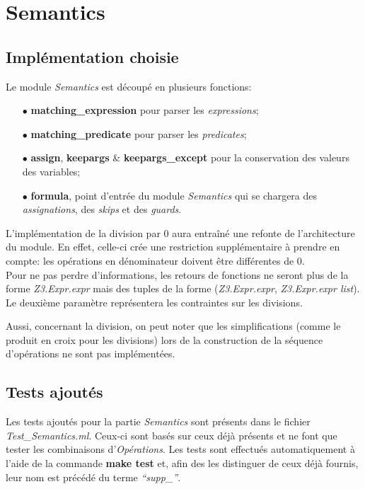 \section{Semantics}

\subsection{Implémentation choisie}

Le module \textit{Semantics} est découpé en plusieurs fonctions:
\begin{itemize}
\item[$\bullet$] {\textbf{matching\_expression} pour parser les \textit{expressions};}
\item[$\bullet$] {\textbf{matching\_predicate} pour parser les \textit{predicates};}
\item[$\bullet$] {\textbf{assign}, \textbf{keepargs} \& \textbf{keepargs\_except} pour la conservation des valeurs des variables;}
\item[$\bullet$] {\textbf{formula}, point d'entrée du module \textit{Semantics} qui se chargera des \textit{assignations}, des \textit{skips} et des \textit{guards}.}\\
\end{itemize}

L'implémentation de la division par 0 aura entraîné une refonte de l'architecture du module. En effet, celle-ci crée une restriction supplémentaire à prendre en compte: les opérations en dénominateur doivent être différentes de 0.\\
Pour ne pas perdre d'informations, les retours de fonctions ne seront plus de la forme \textit{Z3.Expr.expr} mais des tuples de la forme (\textit{Z3.Expr.expr}, \textit{Z3.Expr.expr list}). Le deuxième paramètre représentera les contraintes sur les divisions.

Aussi, concernant la division, on peut noter que les simplifications (comme le produit en croix pour les divisions) lors de la construction de la séquence d'opérations ne sont pas implémentées.

\subsection{Tests ajoutés}

Les tests ajoutés pour la partie \textit{Semantics} sont présents dans le fichier \textit{Test\_Semantics.ml}. Ceux-ci sont basés sur ceux déjà présents et ne font que tester les combinaisons d'\textit{Opérations}. Les tests sont effectués automatiquement à l'aide de la commande \textbf{make test} et, afin des les distinguer de ceux déjà fournis, leur nom est précédé du terme \textit{``supp\_''}.\\

